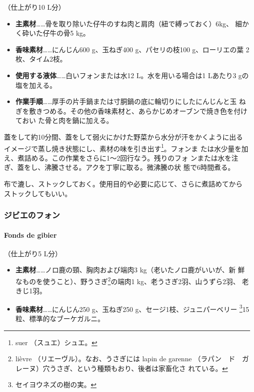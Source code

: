 \begin{recette}
（仕上がり10 L分）

\begin{itemize}
\item
  \textbf{主素材}\ldots{}\ldots{}骨を取り除いた仔牛のすね肉と肩肉（紐で縛っておく）6kg、
  細かく砕いた仔牛の骨5 kg。
\item
  \textbf{香味素材}\ldots{}\ldots{}にんじん600 g、玉ねぎ400
  g、パセリの枝100 g、ローリエの葉 2枚、タイム2枝。
\item
  \textbf{使用する液体}\ldots{}\ldots{}白いフォンまたは水12
  L。水を用いる場合は1 Lあたり3 gの塩を加える。
\item
  \textbf{作業手順}\ldots{}\ldots{}厚手の片手鍋または寸胴鍋の底に輪切りにしたにんじんと玉
  ねぎを敷きつめる。その他の香味素材と、あらかじめオーブンで焼き色を付けておい
  た骨と肉を鍋に加える。
\end{itemize}

蓋をして約10分間、蓋をして弱火にかけた野菜から水分が汗をかくように出る
イメージで蒸し焼き状態にし、素材の味を引き出す\footnote{suer
  （スュエ）シュエ。}。フォンま
たは水少量を加え、煮詰める。この作業をさらに1〜2回行なう。残りのフォ
ンまたは水を注ぎ、蓋をし、沸騰させる。アクを丁寧に取る。微沸騰の状
態で6時間煮る。

布で漉し、ストックしておく。使用目的や必要に応じて、さらに煮詰めてから
ストックしてもいい。

\maeaki

\hypertarget{fondsdegibier}{%
\subsubsection{ジビエのフォン}\label{fondsdegibier}}

\hypertarget{fonds-de-gibier}{%
\paragraph{Fonds de gibier}\label{fonds-de-gibier}}


（仕上がり5 L分）

\begin{itemize}
\item
  \textbf{主素材}\ldots{}\ldots{}ノロ鹿の頸、胸肉および端肉3
  kg（老いたノロ鹿がいいが、新 鮮なものを使うこと）、野うさぎ\footnote{lièvre
    （リエーヴル）。なお、うさぎには lapin de garenne
    （ラパン　ド　ガレーヌ）穴うさぎ、という種類もおり、後者は家畜化さ
    れている。}の端肉1 kg、老うさぎ2羽、山うずら2羽、 老きじ1羽。
\item
  \textbf{香味素材}\ldots{}\ldots{}にんじん250 g、玉ねぎ250
  g、セージ1枝、ジュニパーベリー \footnote{セイヨウネズの樹の実。}15粒、標準的なブーケガルニ。
\end{itemize}


\end{recette}
